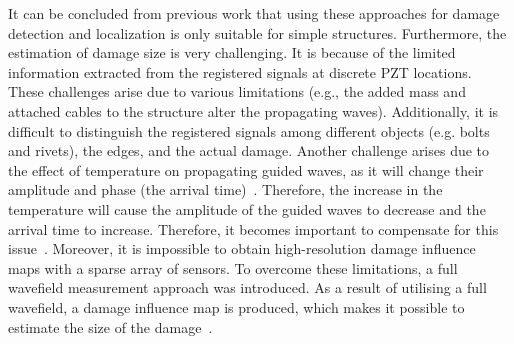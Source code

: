 It can be concluded from previous work that using these approaches for damage detection and localization is only suitable for simple structures. 
Furthermore, the estimation of damage size is very challenging.
It is because of the limited information extracted from the registered signals at discrete PZT locations. 
These challenges arise due to various limitations (e.g., the added mass and attached cables to the structure alter the propagating waves). 
Additionally, it is difficult to distinguish the registered signals among different objects (e.g. bolts and rivets), the edges, and the actual damage. 
Another challenge arises due to the effect of temperature on propagating guided waves, as it will change their amplitude and phase (the arrival time)~\cite{Putkis2015}.
Therefore, the increase in the temperature will cause the amplitude of the guided waves to decrease and the arrival time to increase.
Therefore, it becomes important to compensate for this issue~\cite{Marzani1999}.
Moreover, it is impossible to obtain high-resolution damage influence maps with a sparse array of sensors.
To overcome these limitations, a full wavefield measurement approach was introduced.
As a result of utilising a full wavefield, a damage influence map is produced, which makes it possible to estimate the size of the damage~\cite{Ostachowicz2014}.
%

